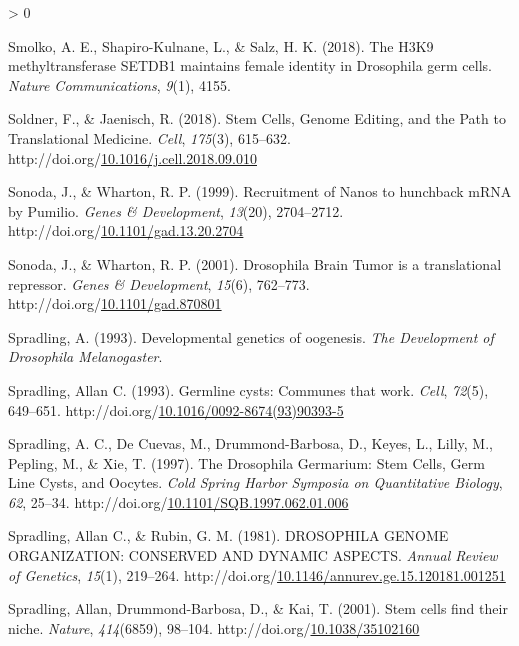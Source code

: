 \documentclass[12pt,oneside]{reedthesis}
\newlength{\cslhangindent}
\newenvironment{CSLReferences}[2] %
 {%
  \setlength{\parindent}{0pt}
  \ifodd #1 \everypar{\setlength{\hangindent}{\cslhangindent}}\ignorespaces\fi
  \ifnum #2 > 0
  \setlength{\parskip}{#2\baselineskip}
  \fi
 }%
 {}
\begin{document}
\begin{CSLReferences}{1}{0}
\leavevmode\hypertarget{ref-Smolko2018}{}%
Smolko, A. E., Shapiro-Kulnane, L., \& Salz, H. K. (2018). The {H3K9} methyltransferase {SETDB1} maintains female identity in {Drosophila} germ cells. \emph{Nature Communications}, \emph{9}(1), 4155.

\leavevmode\hypertarget{ref-Soldner2018d}{}%
Soldner, F., \& Jaenisch, R. (2018). Stem {Cells}, {Genome Editing}, and the {Path} to {Translational Medicine}. \emph{Cell}, \emph{175}(3), 615--632. http://doi.org/\href{https://doi.org/10.1016/j.cell.2018.09.010}{10.1016/j.cell.2018.09.010}

\leavevmode\hypertarget{ref-Sonoda1999a}{}%
Sonoda, J., \& Wharton, R. P. (1999). Recruitment of {Nanos} to hunchback {mRNA} by {Pumilio}. \emph{Genes \& Development}, \emph{13}(20), 2704--2712. http://doi.org/\href{https://doi.org/10.1101/gad.13.20.2704}{10.1101/gad.13.20.2704}

\leavevmode\hypertarget{ref-Sonoda2001d}{}%
Sonoda, J., \& Wharton, R. P. (2001). Drosophila {Brain Tumor} is a translational repressor. \emph{Genes \& Development}, \emph{15}(6), 762--773. http://doi.org/\href{https://doi.org/10.1101/gad.870801}{10.1101/gad.870801}

\leavevmode\hypertarget{ref-spradling1993developmental}{}%
Spradling, A. (1993). Developmental genetics of oogenesis. \emph{The Development of Drosophila Melanogaster}.

\leavevmode\hypertarget{ref-Spradling1993b}{}%
Spradling, Allan C. (1993). Germline cysts: {Communes} that work. \emph{Cell}, \emph{72}(5), 649--651. http://doi.org/\href{https://doi.org/10.1016/0092-8674(93)90393-5}{10.1016/0092-8674(93)90393-5}

\leavevmode\hypertarget{ref-Spradling1997e}{}%
Spradling, A. C., De Cuevas, M., Drummond-Barbosa, D., Keyes, L., Lilly, M., Pepling, M., \& Xie, T. (1997). The {Drosophila Germarium}: {Stem Cells}, {Germ Line Cysts}, and {Oocytes}. \emph{Cold Spring Harbor Symposia on Quantitative Biology}, \emph{62}, 25--34. http://doi.org/\href{https://doi.org/10.1101/SQB.1997.062.01.006}{10.1101/SQB.1997.062.01.006}

\leavevmode\hypertarget{ref-Spradling1981b}{}%
Spradling, Allan C., \& Rubin, G. M. (1981). {DROSOPHILA GENOME ORGANIZATION}: {CONSERVED AND DYNAMIC ASPECTS}. \emph{Annual Review of Genetics}, \emph{15}(1), 219--264. http://doi.org/\href{https://doi.org/10.1146/annurev.ge.15.120181.001251}{10.1146/annurev.ge.15.120181.001251}

\leavevmode\hypertarget{ref-spradlingStemCellsFind2001}{}%
Spradling, Allan, Drummond-Barbosa, D., \& Kai, T. (2001). Stem cells find their niche. \emph{Nature}, \emph{414}(6859), 98--104. http://doi.org/\href{https://doi.org/10.1038/35102160}{10.1038/35102160}


\end{CSLReferences}
\end{document}
